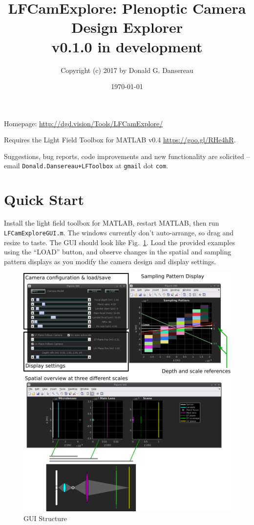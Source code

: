 \documentclass[onecolumn]{article}
\title{
LFCamExplore: Plenoptic Camera Design Explorer\\
{\large v0.1.0 in development }}
\author{Copyright (c) 2017 by Donald G. Dansereau}
\date{\today}
\newcommand{\SymbolText}[1]{\texttt{\small #1}}
\begin{document}
\maketitle
\thispagestyle{empty}\pagestyle{plain}

\noindent
Homepage: \url{http://dgd.vision/Tools/LFCamExplore/}

\vspace{1em}\noindent
Requires the Light Field Toolbox for MATLAB v0.4 \url{https://goo.gl/RHe4hR}.

\vspace{1em}\noindent 
Suggestions, bug reports, code improvements and new functionality are solicited -- email \SymbolText{Donald.Dansereau+LFToolbox} \small{at} \SymbolText{gmail} \small{dot} \SymbolText{com}.


\newpage
\tableofcontents
\newpage

\section{Quick Start}

Install the light field toolbox for MATLAB, restart MATLAB, then run \SymbolText{LFCamExploreGUI.m}.  The windows currently don't auto-arrange, so drag and resize to taste.  The GUI should look like Fig.~\ref{fig_AnnotatedScreenshot}.  Load the provided examples using the ``LOAD'' button, and observe changes in the spatial and sampling pattern displays as you modify the camera design and display settings.

\begin{figure}[h!]
	\centering
	\includegraphics[width=1\textwidth]{Figs/AnnotatedScreenshot}
	\caption{GUI Structure}
	\label{fig_AnnotatedScreenshot}
\end{figure}
\end{document}
